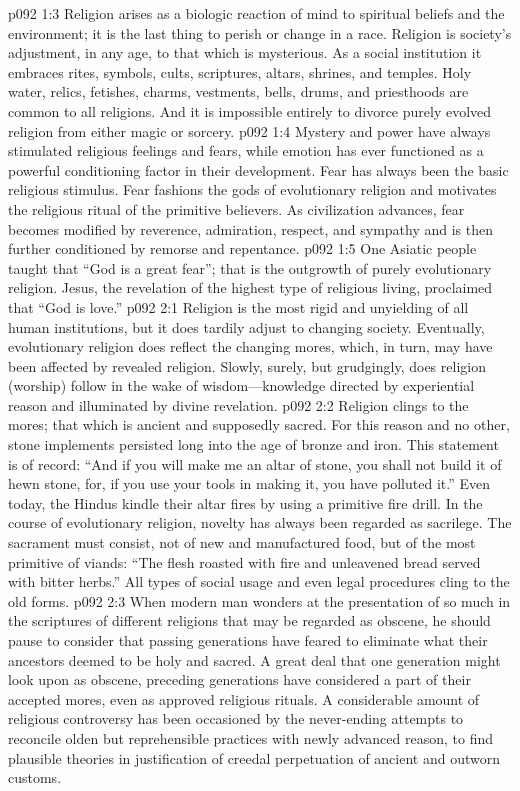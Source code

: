\vs p092 1:3 Religion arises as a biologic reaction of mind to spiritual beliefs and the environment; it is the last thing to perish or change in a race. Religion is society’s adjustment, in any age, to that which is mysterious. As a social institution it embraces rites, symbols, cults, scriptures, altars, shrines, and temples. Holy water, relics, fetishes, charms, vestments, bells, drums, and priesthoods are common to all religions. And it is impossible entirely to divorce purely evolved religion from either magic or sorcery.
\vs p092 1:4 Mystery and power have always stimulated religious feelings and fears, while emotion has ever functioned as a powerful conditioning factor in their development. Fear has always been the basic religious stimulus. Fear fashions the gods of evolutionary religion and motivates the religious ritual of the primitive believers. As civilization advances, fear becomes modified by reverence, admiration, respect, and sympathy and is then further conditioned by remorse and repentance.
\vs p092 1:5 One Asiatic people taught that “God is a great fear”; that is the outgrowth of purely evolutionary religion. Jesus, the revelation of the highest type of religious living, proclaimed that “God is love.”\plusone
{}
\vs p092 2:1 Religion is the most rigid and unyielding of all human institutions, but it does tardily adjust to changing society. Eventually, evolutionary religion does reflect the changing mores, which, in turn, may have been affected by revealed religion. Slowly, surely, but grudgingly, does religion (worship) follow in the wake of wisdom---knowledge directed by experiential reason and illuminated by divine revelation.
\vs p092 2:2 Religion clings to the mores; that which  is ancient and supposedly sacred. For this reason and no other, stone implements persisted long into the age of bronze and iron. This statement is of record: “And if you will make me an altar of stone, you shall not build it of hewn stone, for, if you use your tools in making it, you have polluted it.” Even today, the Hindus kindle their altar fires by using a primitive fire drill. In the course of evolutionary religion, novelty has always been regarded as sacrilege. The sacrament must consist, not of new and manufactured food, but of the most primitive of viands: “The flesh roasted with fire and unleavened bread served with bitter herbs.” All types of social usage and even legal procedures cling to the old forms.
\vs p092 2:3 When modern man wonders at the presentation of so much in the scriptures of different religions that may be regarded as obscene, he should pause to consider that passing generations have feared to eliminate what their ancestors deemed to be holy and sacred. A great deal that one generation might look upon as obscene, preceding generations have considered a part of their accepted mores, even as approved religious rituals. A considerable amount of religious controversy has been occasioned by the never\hyp{}ending attempts to reconcile olden but reprehensible practices with newly advanced reason, to find plausible theories in justification of creedal perpetuation of ancient and outworn customs.

